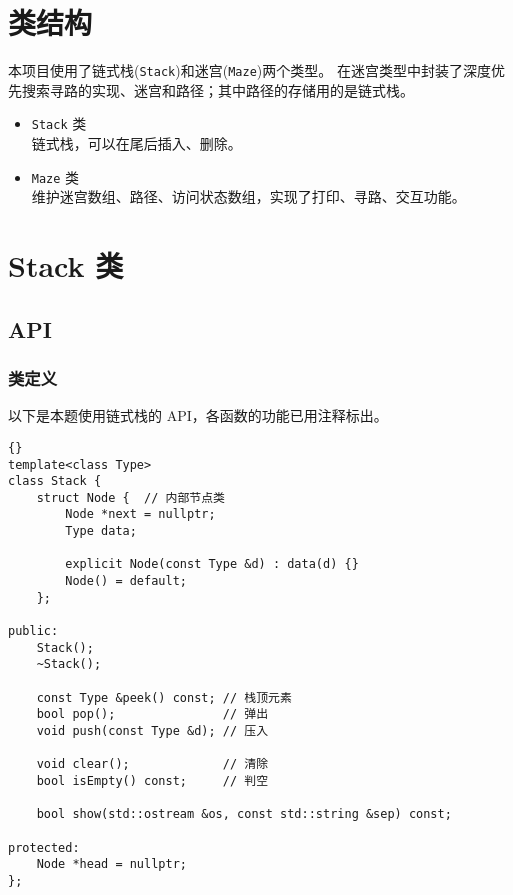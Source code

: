 
\chapter{类结构}
本项目使用了{\kaishu 链式栈(\lstinline{Stack})}和{\kaishu 迷宫(\lstinline{Maze})}两个类型。%
在迷宫类型中封装了深度优先搜索寻路的实现、迷宫和路径；其中路径的存储用的是链式栈。

\begin{itemize}
    \item \lstinline{Stack} 类\\
    链式栈，可以在尾后插入、删除。
    \item \lstinline{Maze} 类\\
    维护迷宫数组、路径、访问状态数组，实现了打印、寻路、交互功能。
\end{itemize}


\chapter{Stack 类}

\section{API}

\subsection{类定义}
以下是本题使用链式栈的 API，各函数的功能已用注释标出。
\begin{lstlisting}[morendkeywords={LinkedList}, firstnumber=637, caption=LinkedList 类定义]{}
template<class Type>
class Stack {
    struct Node {  // 内部节点类
        Node *next = nullptr;
        Type data;

        explicit Node(const Type &d) : data(d) {}
        Node() = default;
    };

public:
    Stack();
    ~Stack();

    const Type &peek() const; // 栈顶元素
    bool pop();               // 弹出
    void push(const Type &d); // 压入

    void clear();             // 清除
    bool isEmpty() const;     // 判空

    bool show(std::ostream &os, const std::string &sep) const;

protected:
    Node *head = nullptr;
};
\end{lstlisting}

